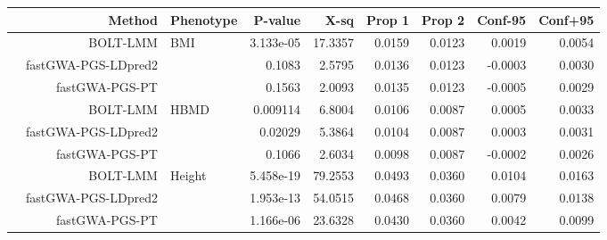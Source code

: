 \documentclass[10pt]{article}
\begin{document}
\begin{table}[!htb]
\centering
{}
\begin{tabular}{rrlrrrrrr}
  \hline
 & Method & Phenotype & P-value & X-sq & Prop 1 & Prop 2 & Conf-95 & Conf+95 \\ 
  \hline
& BOLT-LMM & BMI & 3.133e-05 & 17.3357 & 0.0159 & 0.0123 & 0.0019 & 0.0054 \\ 
  & fastGWA-PGS-LDpred2 &  & 0.1083 & 2.5795 & 0.0136 & 0.0123 & -0.0003 & 0.0030 \\ 
  & fastGWA-PGS-PT &  & 0.1563 & 2.0093 & 0.0135 & 0.0123 & -0.0005 & 0.0029 \\ 
  \hline
  & BOLT-LMM & HBMD & 0.009114 & 6.8004 & 0.0106 & 0.0087 & 0.0005 & 0.0033 \\ 
  & fastGWA-PGS-LDpred2  &  & 0.02029 & 5.3864 & 0.0104 & 0.0087 & 0.0003 & 0.0031 \\ 
  & fastGWA-PGS-PT  &  & 0.1066 & 2.6034 & 0.0098 & 0.0087 & -0.0002 & 0.0026 \\ 
  \hline
  & BOLT-LMM  & Height & 5.458e-19 & 79.2553 & 0.0493 & 0.0360 & 0.0104 & 0.0163 \\ 
  & fastGWA-PGS-LDpred2  &  & 1.953e-13 & 54.0515 & 0.0468 & 0.0360 & 0.0079 & 0.0138 \\ 
  & fastGWA-PGS-PT  &  & 1.166e-06 & 23.6328 & 0.0430 & 0.0360 & 0.0042 & 0.0099 \\ 
   \hline
\end{tabular}
\end{table}
\end{document}
